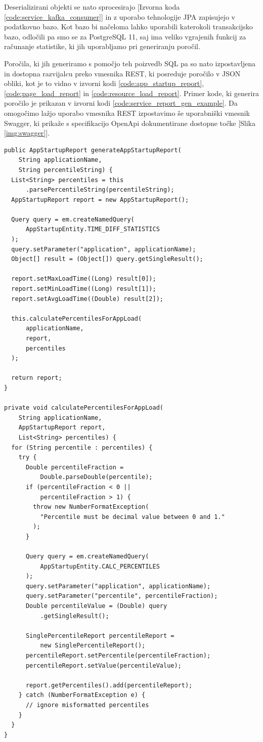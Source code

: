 \documentclass[a4paper, 12pt]{book}
\begin{document}
Deserializirani objekti se nato sprocesirajo [Izvorna koda \ref{code:service_kafka_consumer}] in z uporabo tehnologije JPA zapisujejo v podatkovno bazo. Kot bazo bi načeloma lahko uporabili katerokoli transakcijsko bazo, odločili pa smo se za PostgreSQL 11, saj ima veliko vgrajenih funkcij za računanje statistike, ki jih uporabljamo pri generiranju poročil.

Poročila, ki jih generiramo s pomočjo teh poizvedb SQL pa so nato izpostavljena in dostopna razvijalcu preko vmesnika REST, ki posreduje poročilo v JSON obliki, kot je to vidno v izvorni kodi \ref{code:app_startup_report}, \ref{code:page_load_report} in \ref{code:resource_load_report}. Primer kode, ki generira poročilo je prikazan v izvorni kodi \ref{code:service_report_gen_example}. Da omogočimo lažjo uporabo vmesnika REST izpostavimo še uporabniški vmesnik Swagger, ki prikaže s specifikacijo OpenApi dokumentirane dostopne točke [Slika \ref{img:swagger}].

\begin{lstlisting}[label=code:service_report_gen_example, caption=Pridobivanje poročila o zagonskem času aplikacije]
public AppStartupReport generateAppStartupReport(
    String applicationName,
    String percentileString) {
  List<String> percentiles = this
      .parsePercentileString(percentileString);
  AppStartupReport report = new AppStartupReport();

  Query query = em.createNamedQuery(
      AppStartupEntity.TIME_DIFF_STATISTICS
  );
  query.setParameter("application", applicationName);
  Object[] result = (Object[]) query.getSingleResult();

  report.setMaxLoadTime((Long) result[0]);
  report.setMinLoadTime((Long) result[1]);
  report.setAvgLoadTime((Double) result[2]);

  this.calculatePercentilesForAppLoad(
      applicationName,
      report,
      percentiles
  );

  return report;
}

private void calculatePercentilesForAppLoad(
    String applicationName,
    AppStartupReport report,
    List<String> percentiles) {
  for (String percentile : percentiles) {
    try {
      Double percentileFraction = 
          Double.parseDouble(percentile);
      if (percentileFraction < 0 ||
          percentileFraction > 1) {
        throw new NumberFormatException(
          "Percentile must be decimal value between 0 and 1."
        );
      }
  
      Query query = em.createNamedQuery(
          AppStartupEntity.CALC_PERCENTILES
      );
      query.setParameter("application", applicationName);
      query.setParameter("percentile", percentileFraction);
      Double percentileValue = (Double) query
          .getSingleResult();

      SinglePercentileReport percentileReport = 
          new SinglePercentileReport();
      percentileReport.setPercentile(percentileFraction);
      percentileReport.setValue(percentileValue);

      report.getPercentiles().add(percentileReport);
    } catch (NumberFormatException e) {
      // ignore misformatted percentiles
    }
  }
}
\end{lstlisting} 
\end{document}
